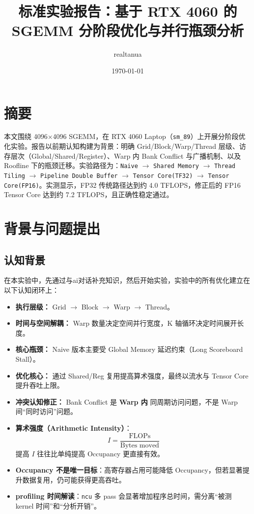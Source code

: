 \documentclass[12pt,a4paper]{ctexart}
\title{标准实验报告：基于 RTX 4060 的 SGEMM 分阶段优化与并行瓶颈分析}
\author{realtanua}
\date{\today}
\begin{document}
\maketitle
\tableofcontents
\newpage

\section{摘要}
本文围绕 4096\(\times\)4096 SGEMM，在 RTX 4060 Laptop（\texttt{sm\_89}）上开展分阶段优化实验。报告以前期认知构建为背景：明确 Grid/Block/Warp/Thread 层级、访存层次（Global/Shared/Register）、Warp 内 Bank Conflict 与广播机制、以及 Roofline 下的瓶颈迁移。实验路径为：\texttt{Naive} $\rightarrow$ \texttt{Shared Memory} $\rightarrow$ \texttt{Thread Tiling} $\rightarrow$ \texttt{Pipeline Double Buffer} $\rightarrow$ \texttt{Tensor Core(TF32)} $\rightarrow$ \texttt{Tensor Core(FP16)}。实测显示，FP32 传统路径达到约 4.0 TFLOPS，修正后的 FP16 Tensor Core 达到约 7.2 TFLOPS，且正确性稳定通过。

\section{背景与问题提出}
\subsection{认知背景}
在本实验中，先通过与ai对话补充知识，然后开始实验，实验中的所有优化建立在以下认知闭环上：
\begin{itemize}[leftmargin=2em]
  \item \textbf{执行层级：} Grid $\rightarrow$ Block $\rightarrow$ Warp $\rightarrow$ Thread。
  \item \textbf{时间与空间解耦：} Warp 数量决定空间并行宽度，K 轴循环决定时间展开长度。
  \item \textbf{核心瓶颈：} Naive 版本主要受 Global Memory 延迟约束（Long Scoreboard Stall）。
  \item \textbf{优化核心：} 通过 Shared/Reg 复用提高算术强度，最终以流水与 Tensor Core 提升吞吐上限。
  \item \textbf{冲突认知修正：} Bank Conflict 是 \textbf{Warp 内} 同周期访问问题，不是 Warp 间“同时访问”问题。
  \item \textbf{算术强度（Arithmetic Intensity）}：
  \[
  I = \frac{\text{FLOPs}}{\text{Bytes moved}}
  \]
  提高 \(I\) 往往比单纯提高 Occupancy 更直接有效。
  \item \textbf{Occupancy 不是唯一目标}：高寄存器占用可能降低 Occupancy，但若显著提升数据复用，仍可能获得更高吞吐。
  \item \textbf{profiling 时间解读}：\texttt{ncu} 多 pass 会显著增加程序总时间，需分离“被测 kernel 时间”和“分析开销”。
\end{itemize}
\end{document}
